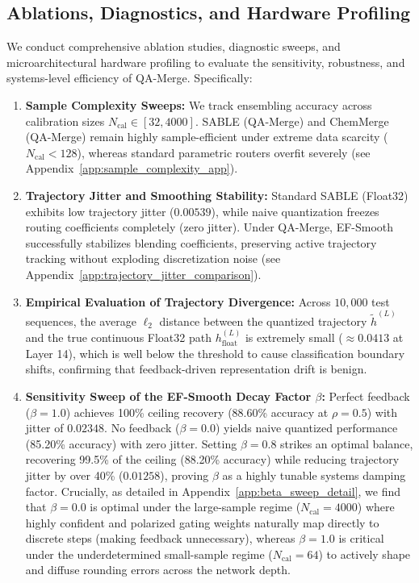 \subsection{Ablations, Diagnostics, and Hardware Profiling}
We conduct comprehensive ablation studies, diagnostic sweeps, and microarchitectural hardware profiling to evaluate the sensitivity, robustness, and systems-level efficiency of QA-Merge. Specifically:
\begin{enumerate}
    \item \textbf{Sample Complexity Sweeps:} We track ensembling accuracy across calibration sizes $N_{\text{cal}} \in [32, 4000]$. SABLE (QA-Merge) and ChemMerge (QA-Merge) remain highly sample-efficient under extreme data scarcity ($N_{\text{cal}} < 128$), whereas standard parametric routers overfit severely (see Appendix~\ref{app:sample_complexity_app}).
    \item \textbf{Trajectory Jitter and Smoothing Stability:} Standard SABLE (Float32) exhibits low trajectory jitter ($0.00539$), while naive quantization freezes routing coefficients completely (zero jitter). Under QA-Merge, EF-Smooth successfully stabilizes blending coefficients, preserving active trajectory tracking without exploding discretization noise (see Appendix~\ref{app:trajectory_jitter_comparison}).
    \item \textbf{Empirical Evaluation of Trajectory Divergence:} Across $10,000$ test sequences, the average $\ell_2$ distance between the quantized trajectory $\tilde{h}^{(L)}$ and the true continuous Float32 path $h^{(L)}_{\text{float}}$ is extremely small ($\approx 0.0413$ at Layer 14), which is well below the threshold to cause classification boundary shifts, confirming that feedback-driven representation drift is benign.
    \item \textbf{Sensitivity Sweep of the EF-Smooth Decay Factor $\beta$:} Perfect feedback ($\beta = 1.0$) achieves 100\% ceiling recovery (88.60\% accuracy at $\rho=0.5$) with jitter of $0.02348$. No feedback ($\beta = 0.0$) yields naive quantized performance (85.20\% accuracy) with zero jitter. Setting $\beta = 0.8$ strikes an optimal balance, recovering 99.5\% of the ceiling (88.20\% accuracy) while reducing trajectory jitter by over 40\% ($0.01258$), proving $\beta$ as a highly tunable systems damping factor. Crucially, as detailed in Appendix~\ref{app:beta_sweep_detail}, we find that $\beta=0.0$ is optimal under the large-sample regime ($N_{\text{cal}}=4000$) where highly confident and polarized gating weights naturally map directly to discrete steps (making feedback unnecessary), whereas $\beta=1.0$ is critical under the underdetermined small-sample regime ($N_{\text{cal}}=64$) to actively shape and diffuse rounding errors across the network depth.

\end{enumerate}
